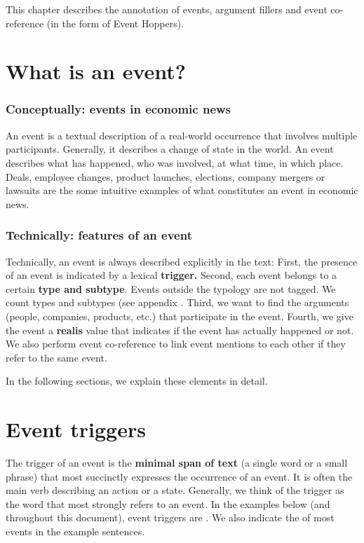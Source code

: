 This chapter describes the annotation of events, argument fillers and event co-reference (in the form of Event Hoppers).

\section{What is an event?}

\subsubsection{Conceptually: events in economic news}

An event is a textual description of a real-world occurrence that involves multiple participants.
Generally, it describes a change of state in the world.
An event describes what has happened, who was involved, at what time, in which place.
Deals, employee changes, product launches, elections, company mergers or lawsuits are the some intuitive examples of what constitutes an event in economic news. 

\subsubsection{Technically: features of an event}

Technically, an event is always described explicitly in the text:
First, the presence of an event is indicated by a lexical \textbf{trigger.}
Second, each event belongs to a certain \textbf{type and subtype}.
Events outside the typology are not tagged.
We count \typecount types and \subtypecount subtypes (see appendix . 
Third, we want to find the arguments (people, companies, products, etc.) that participate in the event.
Fourth, we give the event a \textbf{realis} value that indicates if the event has actually happened or not.
We also perform event co-reference to link event mentions to each other if they refer to the same event.

In the following sections, we explain these elements in detail.

\section{Event triggers}

The trigger of an event is the \textbf{minimal span of text} (a single word or a small phrase) that most succinctly expresses the occurrence of an event.
It is often the main verb describing an action or a state.
Generally, we think of the trigger as the word that most strongly refers to an event.
In the examples below (and throughout this document), event triggers are .
We also indicate the  of most events in the example sentences.

